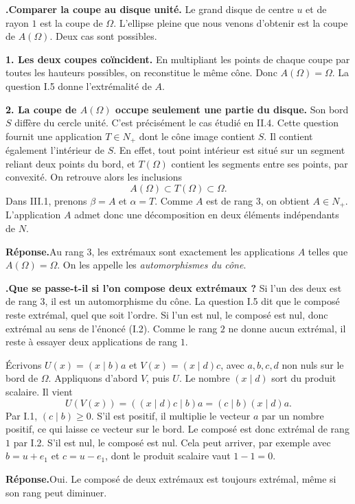 \documentclass[a4paper,12pt]{article}
\newcommand{\Om}{\Omega}
\newcommand{\ps}[2]{(#1\mid #2)}
\newcounter{pas}
\newcommand{\etape}[1]{\par\Needspace{2.25\baselineskip}\smallskip\stepcounter{pas}%
  \textbf{\textcolor{deep}{\thepas.\enspace #1}}\enspace\ignorespaces}
\newcommand{\bilan}[1]{\par\smallskip\noindent
  \begingroup\setlength{\fboxsep}{6pt}\colorbox{peach}{\parbox{\dimexpr\linewidth-2\fboxsep\relax}{\color{deep}\textbf{Réponse.}\enspace #1}}\endgroup\par\smallskip}
\begin{document}
\etape{Comparer la coupe au disque unité.}
Le grand disque de centre $u$ et de rayon $1$ est la coupe de $\Om$. L'ellipse pleine que nous venons d'obtenir est la coupe de $A(\Om)$. Deux cas sont possibles.

\textbf{1. Les deux coupes coïncident.} En multipliant les points de chaque coupe par toutes les hauteurs possibles, on reconstitue le même cône. Donc $A(\Om)=\Om$. La question I.5 donne l'extrémalité de $A$.

\textbf{2. La coupe de $A(\Om)$ occupe seulement une partie du disque.} Son bord $S$ diffère du cercle unité. C'est précisément le cas étudié en II.4. Cette question fournit une application $T\in N_+$ dont le cône image contient $S$. Il contient également l'intérieur de $S$. En effet, tout point intérieur est situé sur un segment reliant deux points du bord, et $T(\Om)$ contient les segments entre ses points, par convexité. On retrouve alors les inclusions
\[
                       A(\Om)\subset T(\Om)\subset\Om .
\]
Dans III.1, prenons $\beta=A$ et $\alpha=T$. Comme $A$ est de rang $3$, on obtient $A\in N_+$. L'application $A$ admet donc une décomposition en deux éléments indépendants de $N$.

\bilan{Au rang $3$, les extrémaux sont exactement les applications $A$ telles que $A(\Om)=\Om$. On les appelle les \emph{automorphismes du cône}.}

\etape{Que se passe-t-il si l'on compose deux extrémaux ?}
Si l'un des deux est de rang $3$, il est un automorphisme du cône. La question I.5 dit que le composé reste extrémal, quel que soit l'ordre. Si l'un est nul, le composé est nul, donc extrémal au sens de l'énoncé (I.2). Comme le rang $2$ ne donne aucun extrémal, il reste à essayer deux applications de rang $1$.

Écrivons $U(x)=\ps{x}{b}a$ et $V(x)=\ps{x}{d}c$, avec $a,b,c,d$ non nuls sur le bord de $\Om$. Appliquons d'abord $V$, puis $U$. Le nombre $\ps{x}{d}$ sort du produit scalaire. Il vient
\[
           U(V(x))=\ps{\ps{x}{d}c}{b}a
                    =\ps{c}{b}\ps{x}{d}a.
\]
Par I.1, $\ps{c}{b}\geq0$. S'il est positif, il multiplie le vecteur $a$ par un nombre positif, ce qui laisse ce vecteur sur le bord. Le composé est donc extrémal de rang $1$ par I.2. S'il est nul, le composé est nul. Cela peut arriver, par exemple avec $b=u+e_1$ et $c=u-e_1$, dont le produit scalaire vaut $1-1=0$.

\bilan{Oui. Le composé de deux extrémaux est toujours extrémal, même si son rang peut diminuer.}
\end{document}
